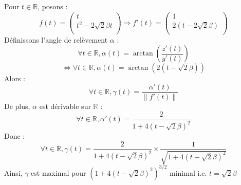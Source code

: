 Pour $t\in\mathbb{R}$, posons :
\[
  f(t) =
  \left(
  \begin{array}{c}
      t                        \\
      t^{2} - 2\sqrt{2}\beta t \\
    \end{array}
  \right)
  \Rightarrow
  f'(t) =
  \left(
  \begin{array}{c}
      1                     \\
      2(t - 2\sqrt{2}\beta) \\
    \end{array}
  \right)
\]
Définissons l'angle de relèvement $\alpha$ : \[\forall t\in\mathbb{R}, \alpha(t) = \arctan{(\frac{z'(t)}{y'(t)})}\]
\[\iff\forall t\in\mathbb{R}, \alpha(t) = \arctan{(2(t-\sqrt{2}\beta))}\]
Alors :
\[
  \forall t\in\mathbb{R},\gamma(t) = \frac{\alpha'(t)}{\left\|f'(t)\right\|}
\]
De plus, $\alpha$ est dérivable sur $\mathbb{R}$ :
\[\forall t\in\mathbb{R}, \alpha'(t) = \frac{2}{1+4(t-\sqrt{2}\beta)^{2}}\]
Donc :
\[\forall t\in\mathbb{R}, \gamma(t) = \frac{2}{1+4(t-\sqrt{2}\beta)^{2}}\times \frac{1}{\sqrt{1+4(t-\sqrt{2}\beta)^{2}}}\]
Ainsi, $\gamma$ est maximal pour $(1+4(t-\sqrt{2}\beta)^{2})^{3/2}$ minimal i.e. $t=\sqrt{2}\beta$
